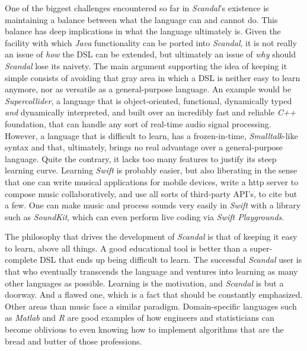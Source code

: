 One of the biggest challenges encountered so far in \emph{Scandal}'s existence is maintaining a balance between what the language can and cannot do. This balance has deep implications in what the language ultimately is. Given the facility with which \emph{Java} functionality can be ported into \emph{Scandal}, it is not really an issue of \emph{how} the DSL can be extended, but ultimately an issue of \emph{why} should \emph{Scandal} lose its naivety. The main argument supporting the idea of keeping it simple consists of avoiding that gray area in which a DSL is neither easy to learn anymore, nor as versatile as a general-purpose language. An example would be \emph{Supercollider}, a language that is object-oriented, functional, dynamically typed \emph{and} dynamically interpreted, and built over an incredibly fast and reliable \emph{C++} foundation, that can handle any sort of real-time audio signal processing. However, a language that is difficult to learn, has a frozen-in-time, \emph{Smalltalk}-like syntax and that, ultimately, brings no real advantage over a general-purpose language. Quite the contrary, it lacks too many features to justify its steep learning curve. Learning \emph{Swift} is probably easier, but also liberating in the sense that one can write musical applications for mobile devices, write a http server to compose music collaboratively, and use all sorts of third-party API's, to cite but a few. One can make music and process sounds very easily in \emph{Swift} with a library such as \emph{SoundKit}, which can even perform live coding via \emph{Swift Playgrounds}.

The philosophy that drives the development of \emph{Scandal} is that of keeping it easy to learn, above all things. A good educational tool is better than a super-complete DSL that ends up being difficult to learn. The successful \emph{Scandal} user is that who eventually transcends the language and ventures into learning as many other languages as possible. Learning is the motivation, and \emph{Scandal} is but a doorway. And a flawed one, which is a fact that should be constantly emphasized. Other areas than music face a similar paradigm. Domain-specific languages such as \emph{Matlab} and \emph{R} are good examples of how engineers and statisticians can become oblivious to even knowing how to implement algorithms that are the bread and butter of those professions.

